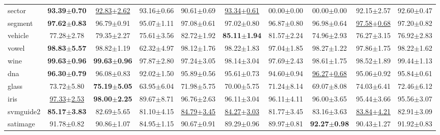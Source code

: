 \documentclass{article}
\begin{document}
\begin{table*}[t]
\begin{tabular*}{\linewidth}{@{\extracolsep{-0.25cm}}lccccccccc}
sector             & \textbf{93.39$\pm$0.70}   &\underline{92.83$\pm$2.62}&93.16$\pm$0.66      &90.61$\pm$0.69            &\underline{93.34$\pm$0.61}                    &00.00$\pm$0.00    &00.00$\pm$0.00             &92.15$\pm$2.57            &92.60$\pm$0.47\\
segment            & \textbf{97.62$\pm$0.83}   &96.79$\pm$0.91            &95.07$\pm$1.11      &97.08$\pm$0.61            &97.02$\pm$0.80       &96.87$\pm$0.80    &96.98$\pm$0.64             &\underline{97.58$\pm$0.68}&97.20$\pm$0.82\\
vehicle            & 77.28$\pm$2.78            &79.35$\pm$2.27            &75.61$\pm$3.56      &82.72$\pm$1.92            &\textbf{85.11$\pm$1.94}       &81.57$\pm$2.24    &74.96$\pm$2.93             &76.27$\pm$3.15            &76.92$\pm$2.83\\
vowel              &\textbf{98.83$\pm$5.57}    &98.82$\pm$1.19            &62.32$\pm$4.97      &98.12$\pm$1.76            &98.22$\pm$1.83       &97.04$\pm$1.85    &98.27$\pm$1.22             &97.86$\pm$1.75            &98.22$\pm$1.62\\
wine               &\textbf{99.63$\pm$0.96}    &\textbf{99.63$\pm$0.96}   &97.87$\pm$2.80      &97.24$\pm$3.05            &98.14$\pm$3.04       &97.69$\pm$2.43    &98.61$\pm$1.75             &98.52$\pm$1.89            &99.44$\pm$1.13            \\
dna                &\textbf{96.30$\pm$0.79}    &96.08$\pm$0.83            &92.02$\pm$1.50      &95.89$\pm$0.56            &95.61$\pm$0.73       &94.60$\pm$0.94    &\underline{96.27$\pm$0.68}             &95.06$\pm$0.92            &95.84$\pm$0.61\\
glass              & 73.72$\pm$5.80            &\textbf{75.19$\pm$5.05}   &63.95$\pm$6.04      &71.98$\pm$5.75            &70.00$\pm$5.75       &71.24$\pm$8.14    &69.07$\pm$8.08             &74.03$\pm$6.41            &72.46$\pm$6.12\\
iris               &\underline{97.33$\pm$2.53} &\textbf{98.00$\pm$2.25}   &89.67$\pm$8.71      &96.76$\pm$2.63            &96.11$\pm$3.04       &96.11$\pm$4.11    &96.00$\pm$3.65             &95.44$\pm$3.66            &95.56$\pm$3.07\\
svmguide2          &\textbf{85.17$\pm$3.83}    &82.69$\pm$5.65            &81.10$\pm$4.15      &\underline{84.79$\pm$3.45}&\underline{84.27$\pm$3.03}  &81.77$\pm$3.45    &83.16$\pm$3.63             &\underline{83.84$\pm$4.21}            &82.91$\pm$3.09\\
satimage           &91.78$\pm$0.82             &90.86$\pm$1.07            &84.95$\pm$1.15      &90.67$\pm$0.91            &89.29$\pm$0.96       &89.97$\pm$0.81    &\textbf{92.27$\pm$0.98}    &90.43$\pm$1.27            &91.92$\pm$0.83\\
\bottomrule
\end{tabular*}
\vspace{-0.3cm}
\end{table*}
\end{document}
